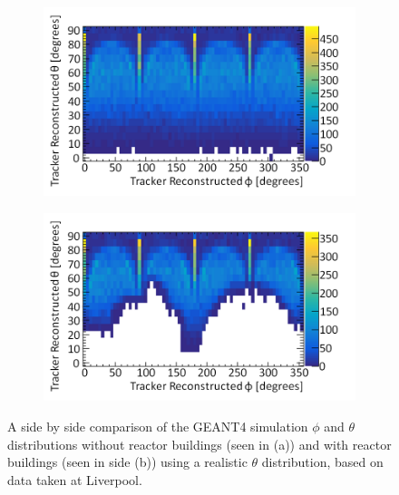 \begin{figure}[!h]
\centering
\begin{subfigure}{.5\textwidth}
  \centering
  \includegraphics[width=\linewidth]{Chapter6/Figs/Raster/thetaVsPhiSimulatedWithReactor0MedText.png}
  \captionsetup{width=.9\linewidth}
  \caption{}
  \label{subFig:thetaVsPhiSimulatedWithReactor0}
\end{subfigure}%
\begin{subfigure}{.5\textwidth}
  \centering
\includegraphics[width=\linewidth]{Chapter6/Figs/Raster/thetaVsPhiSimulatedWithReactor100MedText.png}
  \captionsetup{width=.9\linewidth}
  \caption{}
  \label{subFig:thetaVsPhiSimulatedWithReactor100}
\end{subfigure}
\caption{A side by side comparison of the GEANT4 simulation $\phi$ and $\theta$ distributions without reactor buildings (seen in (a)) and with reactor buildings (seen in side (b)) using a realistic $\theta$ distribution, based on data taken at Liverpool.}
\label{fig:thetaVsPhiSimulatedWithReactor_0-100}
\end{figure}

